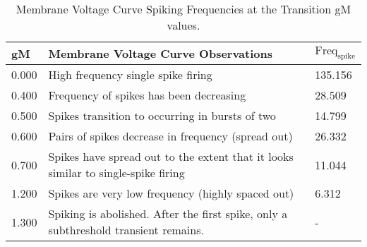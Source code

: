 \documentclass[12pt]{article}
\begin{document}
\begin{table}                                                                         
\centering                                                                            
\begin{tabular}{|l|l|l|}                                                              
\hline                                                                                
gM & Membrane Voltage Curve Observations & $\text{Freq}_{\text{spike}}$ \\                                           
\hline                                                                                
0.000 & High frequency single spike firing & 135.156 \\                                                          
\hline                                                                                
0.400 & Frequency of spikes has been decreasing & 28.509 \\                                                           
\hline                                                                                
0.500 & Spikes transition to occurring in bursts of two & 14.799 \\
\hline                                                                                
0.600 & Pairs of spikes decrease in frequency (spread out) & 26.332 \\
\hline
0.700 & Spikes have spread out to the extent that it looks similar to single-spike firing & 11.044 \\
\hline                                                                                
1.200 & Spikes are very low frequency (highly spaced out) & 6.312 \\                                                            
\hline                                                                                
1.300 & Spiking is abolished. After the first spike, only a subthreshold transient remains. & - \\                                                                
\hline                                                                                
\end{tabular}                                                                         
\caption{Membrane Voltage Curve Spiking Frequencies at the Transition gM values.}
\label{table:2a3}                                                                 
\end{table}                                                                           
\end{document}
